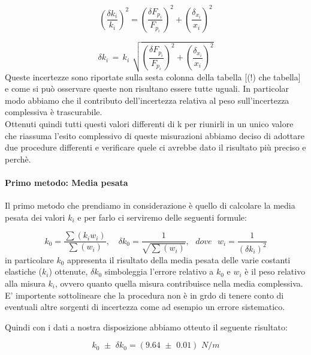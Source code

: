 \begin{equation*}
	\left(\frac{\delta {k_{i}}}{k_{i}}\right)^2  =  \left(\frac{\delta F_{p_{i}}}{F_{p_{i}}}\right)^2  +  \left(\frac{\delta_{x_{i}}}{x_{i}}\right)^2 
\end{equation*}

\begin{equation*}
	\delta k_{i} \,=\, k_i\,\, \sqrt{\left(\frac{\delta F_{p_{i}}}{F_{p_{i}}}\right)^2 + \left(\frac{\delta_{x_{i}}}{x_{i}}\right)^2} 
\end{equation*}
%
Queste incertezze sono riportate sulla sesta colonna della tabella [(!) che tabella] e come si può osservare queste non risultano essere tutte uguali. In particolar modo abbiamo che il contributo dell'incertezza relativa al peso sull'incertezza complessiva è trascurabile.\\
Ottenuti quindi tutti questi valori differenti di k per riunirli in un unico valore che riassuma l'esito complessivo di queste misurazioni abbiamo deciso di adottare due procedure differenti e verificare quele ci avrebbe dato il risultato più preciso e perchè.

\paragraph{Primo metodo: Media pesata\\}
Il primo metodo che prendiamo in considerazione è quello di calcolare la media pesata dei valori $k_{i}$ e per farlo ci serviremo delle seguenti formule:

\begin{equation*}
		k_{0} = \frac{\sum (k_i w_i)}{\sum (w_i)} , \,\,\,\,\,\, \delta k_0 = \frac{1}{\sqrt{\sum (w_i)}} , \,\,\,\,dove\,\,\,\, w_i = \frac{1}{(\delta k_i)^2}
\end{equation*}
%
in particolare $k_0$ appresenta il risultato della media pesata delle varie costanti elastiche ($k_i$) ottenute, $\delta k_0$ simboleggia l'errore relativo a $k_0$ e $w_i$ è il peso relativo alla misura $k_i$, ovvero quanto quella misura contribuisce nella media complessiva. E' importente sottolineare che la procedura non è in grdo di tenere conto di eventuali altre sorgenti di incertezza come ad esempio un errore sistematico.

Quindi con i dati a nostra disposizione abbiamo otteuto il seguente risultato:

\begin{equation}
	k_0 \,\, \pm \,\, \delta k_0 =  (9.64 \,\, \pm \,\, 0.01) \,\,N/m
\end{equation}

